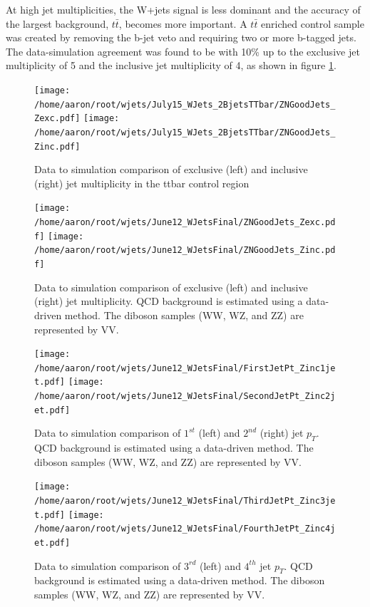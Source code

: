 \documentclass[oneside, letterpaper, oldfontcommands]{memoir}
\begin{document}
\qquad At high jet multiplicities, the W+jets signal is less dominant and the accuracy of the largest background, $t\bar{t}$, becomes more important. A $t\bar{t}$ enriched control sample was created by removing the b-jet veto and requiring two or more b-tagged jets. The data-simulation agreement was found to be with 10\% up to the exclusive jet multiplicity of 5 and the inclusive jet multiplicity of 4, as shown in figure \ref{fig:ttbar_excinc}.


\begin{figure}[!Hhtbp]
\begin{center}
\texttt{[image: /home/aaron/root/wjets/July15\_WJets\_2BjetsTTbar/ZNGoodJets\_Zexc.pdf]}
\texttt{[image: /home/aaron/root/wjets/July15\_WJets\_2BjetsTTbar/ZNGoodJets\_Zinc.pdf]}
\end{center}
\caption{Data to simulation comparison of exclusive (left) and inclusive (right) jet multiplicity in the ttbar control region}
\label{fig:ttbar_excinc}
\end{figure}


\begin{figure}[!Hhtbp]
\begin{center}
\texttt{[image: /home/aaron/root/wjets/June12\_WJetsFinal/ZNGoodJets\_Zexc.pdf]}
\texttt{[image: /home/aaron/root/wjets/June12\_WJetsFinal/ZNGoodJets\_Zinc.pdf]}
\end{center}
\caption{Data to simulation comparison of exclusive (left) and inclusive (right) jet multiplicity. QCD background is estimated using a data-driven method. The diboson samples (WW, WZ, and ZZ) are represented by VV.}
\label{mult}
\end{figure}

\begin{figure}[!Hhtbp]
\begin{center}
\texttt{[image: /home/aaron/root/wjets/June12\_WJetsFinal/FirstJetPt\_Zinc1jet.pdf]}
\texttt{[image: /home/aaron/root/wjets/June12\_WJetsFinal/SecondJetPt\_Zinc2jet.pdf]}\\
\end{center}
\caption{Data to simulation comparison of $1^{st}$ (left) and $2^{nd}$ (right) jet $p_{T}$. QCD background is estimated using a data-driven method. The diboson samples (WW, WZ, and ZZ) are represented by VV.}
\label{pt12}
\end{figure}

\begin{figure}[!Hhtbp]
\begin{center}
\texttt{[image: /home/aaron/root/wjets/June12\_WJetsFinal/ThirdJetPt\_Zinc3jet.pdf]}
\texttt{[image: /home/aaron/root/wjets/June12\_WJetsFinal/FourthJetPt\_Zinc4jet.pdf]}
\end{center}
\caption{Data to simulation comparison of $3^{rd}$ (left) and $4^{th}$ jet $p_{T}$. QCD background is estimated using a data-driven method. The diboson samples (WW, WZ, and ZZ) are represented by VV.}
\label{pt34}
\end{figure}
\end{document}
